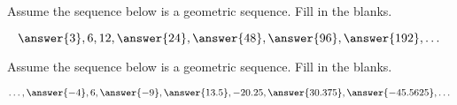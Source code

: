 \documentclass[nooutcomes]{ximera}
\begin{document}
\begin{problem}
Assume the sequence below is a geometric sequence.  Fill in the blanks.

\[
\answer{3}, 6, 12, \answer{24}, \answer{48}, \answer{96}, \answer{192}, \dots
\]

\end{problem}




\begin{problem}
Assume the sequence below is a geometric sequence.  Fill in the blanks.

\[
\dots, \answer{-4}, 6, \answer{-9}, \answer{13.5}, -20.25, \answer{30.375}, \answer{-45.5625}, \dots
\]

\end{problem}




%
%
\end{document}
